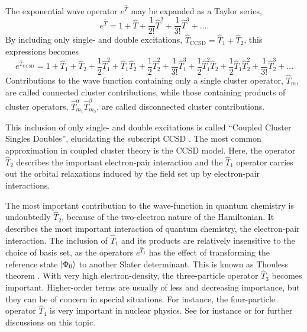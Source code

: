 The exponential wave operator $e^{\hat{T}}$ may be expanded as a Taylor series,
\begin{equation}
    e^{\hat{T}} = 1 + \hat{T} + \frac{1}{2!}\hat{T}^2
        + \frac{1}{3!}\hat{T}^3 + \dots.
\end{equation}
By including only single- and double excitations, 
$\hat{T}_{\text{CCSD}} = \hat{T}_1 + \hat{T}_2$,
this expressions becomes
\begin{equation}
    e^{\hat{T}_{\text{CCSD}}} = 
        1 + \hat{T}_1 + \hat{T}_2 
        + \frac{1}{2}\hat{T}_1^2 + \hat{T}_1\hat{T}_2 + \frac{1}{2} \hat{T}_2^2
        + \frac{1}{3!}\hat{T}_1^3 + \frac{1}{2}\hat{T}_1^2 \hat{T}_2
            + \frac{1}{2}\hat{T}_1\hat{T}_2^2 + \frac{1}{3!}\hat{T}_2^3 
        + \dots
\end{equation}
Contributions to the wave function containing only a single cluster operator, $\hat{T}_m$,
are called connected cluster contributions, while those containing products of cluster 
operators, $\hat{T}_{m_1}^{\alpha}\hat{T}_{m_2}^{\beta}$, are called disconnected
cluster contributions.

This inclusion of only single- and double excitations is called ``Coupled Cluster Singles 
Doubles'', elucidating the subscript CCSD \cite{purvis1982full}.
The most common approximation in coupled cluster theory is the CCSD model. Here, 
the operator $\hat{T}_2$ describes the important electron-pair interaction and the 
$\hat{T}_1$ operator carries out the orbital relaxations induced by the field set 
up by electron-pair interactions. 

\begin{tcolorbox}[title={Importance of different parts of the cluster operator}, 
    colback={white},
    colbacktitle={pink},
    coltitle={black}]
    The most important contribution to the wave-function in quantum chemistry is
    undoubtedly $\hat{T}_2$, because 
    of the two-electron nature of the Hamiltonian. It describes the most important 
    interaction of quantum chemistry, the electron-pair interaction. The inclusion 
    of $\hat{T}_1$ and its products are relatively insensitive to the choice of 
    basis set, as the operators $e^{\hat{T}_1}$ has the effect of transforming 
    the reference state $\ket{\Phi_0}$ to another Slater determinant. This is known 
    as Thouless theorem \cite{thouless1960stability}. With very high electron-density,
    the three-particle operator $\hat{T}_3$ becomes important. Higher-order terms 
    are usually of less and decreasing importance, but they can be of concern in 
    special situations. For instance, the four-particle operator $\hat{T}_4$ is 
    very important in nuclear physics. See for instance 
    \citeauthor{helgaker2014molecular} \cite{helgaker2014molecular} or 
    \citeauthor{shavitt2009many} \cite{shavitt2009many} for further discussions on this
    topic.
\end{tcolorbox}


